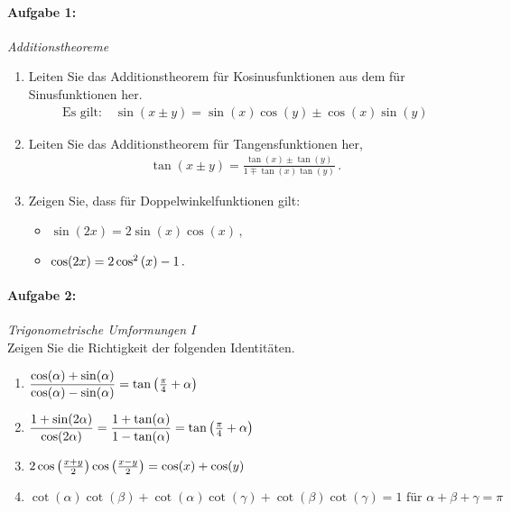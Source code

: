 
\paragraph{Aufgabe 1: } \emph{Additionstheoreme}\\[-1em]
\begin{enumerate}[label=(\alph*)]
\item Leiten Sie das Additionstheorem für Kosinusfunktionen aus dem für Sinusfunktionen her.
\begin{align*}
    \text{Es gilt:} \quad \sin(x\pm y) = \sin(x)\cos(y) \pm \cos(x) \sin(y)
\end{align*}
\item Leiten Sie das Additionstheorem für Tangensfunktionen her,
\begin{align*}
    \tan(x\pm y)=\frac{\tan(x)\pm \tan(y)}{1\mp \tan(x)\tan(y)}\,.
\end{align*}
\item Zeigen Sie, dass für Doppelwinkelfunktionen gilt:
\begin{itemize}
    \item $\sin(2x)=2\sin(x)\cos(x)\,,$
    \item $\cos(2x)=2\cos^2\qty(x)-1\,.$
\end{itemize}
\end{enumerate}

\paragraph{Aufgabe 2: } \emph{Trigonometrische Umformungen I}\\[0.2cm]
Zeigen Sie die Richtigkeit der folgenden Identitäten.
\begin{enumerate}[label=(\alph*)]
    \item $\dfrac{\cos(\alpha)+\sin(\alpha)}{\cos(\alpha)-\sin(\alpha)}=\tan\qty(\frac{\pi}{4}+\alpha)$
    \item $\dfrac{1+\sin (2\alpha)}{\cos (2\alpha)}=\dfrac{1+\tan(\alpha)}{1-\tan(\alpha)}=\tan\qty(\frac{\pi}{4}+\alpha)$
    \item $2\cos\qty(\frac{x+y}{2})\cos\qty(\frac{x-y}{2})=\cos(x)+\cos(y)$
    \item $\cot(\alpha)\cot(\beta)+\cot(\alpha)\cot(\gamma)+\cot(\beta)\cot(\gamma)=1 \text{ für } \alpha+\beta+\gamma=\pi$
\end{enumerate}

